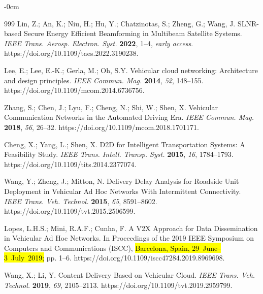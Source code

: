 \documentclass[electronics,aricle,accept,pdftex,moreauthors]{Definitions/mdpi}
\begin{document}
\begin{adjustwidth}{-\extralength}{0cm}
\begin{thebibliography}{999}
Lin, Z.; An, K.; Niu, H.; Hu, Y.; Chatzinotas, S.; Zheng, G.; Wang, J. SLNR-based Secure Energy Efficient Beamforming in Multibeam Satellite Systems. \emph{IEEE Trans. Aerosp. Electron. Syst. }\textbf{2022}, 1--4, \emph{early access}. https://doi.org/10.1109/taes.2022.3190238.

Lee, E.; Lee, E.-K.; Gerla, M.; Oh, S.Y. Vehicular cloud networking: Architecture and design principles. \emph{IEEE Commun. Mag.} \textbf{2014}, \emph{52}, 148–155. https://doi.org/10.1109/mcom.2014.6736756.

Zhang, S.; Chen, J.; Lyu, F.; Cheng, N.; Shi, W.; Shen, X. Vehicular Communication Networks in the Automated Driving Era. \emph{IEEE Commun. Mag.} \textbf{2018}, \emph{56}, 26–32. https://doi.org/10.1109/mcom.2018.1701171.


Cheng, X.; Yang, L.; Shen, X. D2D for Intelligent Transportation Systems: A Feasibility Study. \emph{IEEE Trans. Intell. Transp. Syst.} \textbf{2015}, \emph{16}, 1784–1793. https://doi.org/10.1109/tits.2014.2377074.

Wang, Y.; Zheng, J.; Mitton, N. Delivery Delay Analysis for Roadside Unit Deployment in Vehicular Ad Hoc Networks With Intermittent Connectivity. \emph{IEEE Trans. Veh. Technol. }\textbf{2015}, \emph{65}, 8591–8602. https://doi.org/10.1109/tvt.2015.2506599.

Lopes, L.H.S.; Mini, R.A.F.; Cunha, F. A V2X Approach for Data Dissemination in Vehicular Ad Hoc Networks.  In Proceedings of the 2019 IEEE Symposium on Computers and Communications (ISCC), \hl{Barcelona, Spain, 29~June--3~July~2019; }%
 pp. 1--6. https://doi.org/10.1109/iscc47284.2019.8969698.

Wang, X.; Li, Y. Content Delivery Based on Vehicular Cloud. \emph{IEEE Trans. Veh. Technol.} \textbf{2019}, \emph{69}, 2105–2113. https://doi.org/10.1109/\linebreak tvt.2019.2959799.


\end{thebibliography}
\end{adjustwidth}
\end{document}
